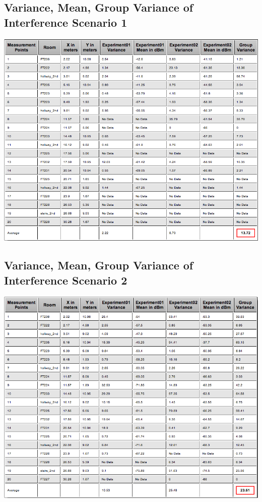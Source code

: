 \documentclass[11pt,a4paper,headinclude,footinclude,chapterprefix=on]{scrreprt}
\begin{document}
\subsection{Variance, Mean, Group Variance of Interference Scenario 1} 
\includegraphics[width=15cm]{../../Source/plot/data/ef_int1.png} 
\subsection{Variance, Mean, Group Variance of Interference Scenario 2} 
\includegraphics[width=15cm]{../../Source/plot/data/ef_int2.png}

\end{document}
